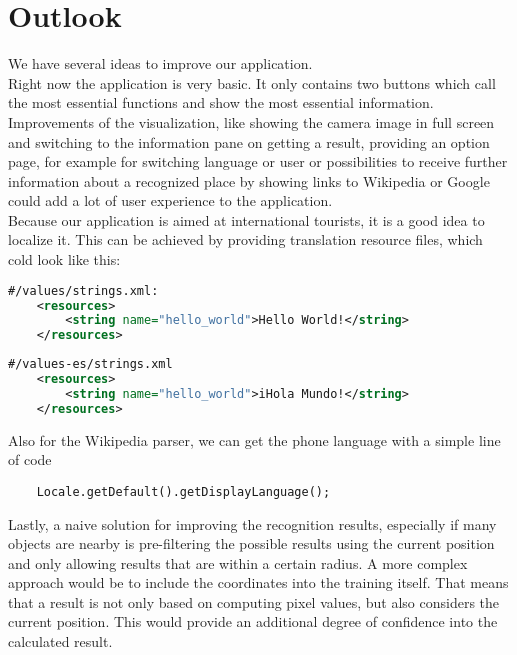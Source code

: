 \section{Outlook}
We have several ideas to improve our application.\\

Right now the application is very basic. It only contains two buttons which call the most essential functions and show the most essential information. Improvements of the visualization, like showing the camera image in full screen and switching to the information pane on getting a result, providing an option page, for example for switching language or user or possibilities to receive further information about a recognized place by showing links to Wikipedia or Google could add a lot of user experience to the application.\\
Because our application is aimed at international tourists, it is a good idea to localize it. This can be achieved by providing translation resource files, which cold look like this:
\begin{lstlisting}[language=XML, basicstyle=\scriptsize]
    #/values/strings.xml:
    <resources>
        <string name="hello_world">Hello World!</string>
    </resources>
\end{lstlisting}

\begin{lstlisting}[language=XML, basicstyle=\scriptsize]
    #/values-es/strings.xml
    <resources>
        <string name="hello_world">iHola Mundo!</string>
    </resources>
\end{lstlisting}

Also for the Wikipedia parser, we can get the phone language with a simple line of code
\begin{lstlisting}
    Locale.getDefault().getDisplayLanguage();
\end{lstlisting}

Lastly, a naive solution for improving the recognition results, especially if many objects are nearby is pre-filtering the possible results using the current position and only allowing results that are within a certain radius. A more complex approach would be to include the coordinates into the training itself. That means that a result is not only based on computing pixel values, but also considers the current position. This would provide an additional degree of confidence into the calculated result.\\
